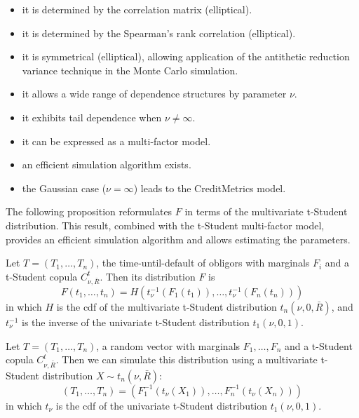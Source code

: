 \documentclass[11pt,fleqn]{book} %
\begin{document}
\begin{itemize}
	\item it is determined by the correlation matrix (elliptical). 
	\item it is determined by the Spearman's rank correlation (elliptical). 
	\item it is symmetrical (elliptical), allowing application of the 
	antithetic reduction variance technique in the Monte Carlo simulation.
	\item it allows a wide range of dependence structures by parameter $\nu$.
	\item it exhibits tail dependence when $\nu \ne \infty$.
	\item it can be expressed as a multi-factor model.
	\item an efficient simulation algorithm exists.
	\item the Gaussian case ($\nu = \infty$) leads to the 
	CreditMetrics\texttrademark{} model.
\end{itemize}

The following proposition reformulates $F$ in terms of the multivariate 
t-Student distribution. This result, combined with the t-Student multi-factor 
model, provides an efficient simulation algorithm and allows estimating the 
parameters.

\begin{proposition}
	\label{prop:dtd}
	Let $T=(T_1,\dots,T_n)$, the time-until-default of obligors with marginals 
	$F_i$ and a t-Student copula $C_{\nu,\bar{R}}^t$. Then its distribution 
	$F$ is
	\begin{displaymath}
		F(t_1,\dots,t_n) = H\left(t_\nu^{-1}(F_1(t_1)), \dots, t_\nu^{-1}(F_n(t_n))\right)
	\end{displaymath}
	in which $H$ is the cdf of the multivariate t-Student distribution 
	$t_n(\nu,0,\bar{R})$, and $t_\nu^{-1}$ is the inverse of the univariate 
	t-Student distribution $t_1(\nu,0,1)$.
\end{proposition}

\begin{corollary}
	\label{cor:dts1}
	Let $T=(T_1, \dots, T_n)$, a random vector with marginals 
	$F_1, \dots, F_n$ and a t-Student copula $C_{\nu,\bar{R}}^t$. 
	Then we can simulate this distribution using a multivariate t-Student 
	distribution $X \sim t_n(\nu,\bar{R})$:
	\begin{displaymath}
		(T_1, \dots, T_n) = \left(F_1^{-1}\left(t_{\nu}(X_1)\right), \dots, F_n^{-1}\left(t_{\nu}(X_n)\right)\right)
	\end{displaymath}
	in which $t_\nu$ is the cdf of the univariate t-Student distribution 
	$t_1(\nu,0,1)$.
\end{corollary}
\end{document}
